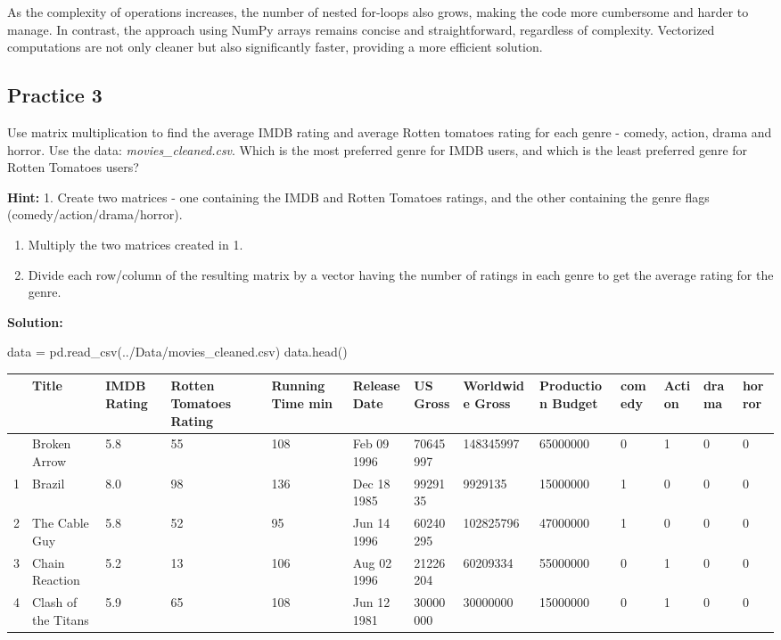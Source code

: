 \documentclass[
  letterpaper,
  DIV=11,
  numbers=noendperiod]{scrreprt}
\newenvironment{Shaded}{\begin{snugshade}}{\end{snugshade}}
\newcommand{\NormalTok}[1]{\textcolor[rgb]{0.00,0.23,0.31}{#1}}
\newcommand{\OperatorTok}[1]{\textcolor[rgb]{0.37,0.37,0.37}{#1}}
\newcommand{\StringTok}[1]{\textcolor[rgb]{0.13,0.47,0.30}{#1}}
\begin{document}
As the complexity of operations increases, the number of nested
for-loops also grows, making the code more cumbersome and harder to
manage. In contrast, the approach using NumPy arrays remains concise and
straightforward, regardless of complexity. Vectorized computations are
not only cleaner but also significantly faster, providing a more
efficient solution.

\hypertarget{practice-3}{%
\subsection{Practice 3}\label{practice-3}}

Use matrix multiplication to find the average IMDB rating and average
Rotten tomatoes rating for each genre - comedy, action, drama and
horror. Use the data: \emph{movies\_cleaned.csv}. Which is the most
preferred genre for IMDB users, and which is the least preferred genre
for Rotten Tomatoes users?

\textbf{Hint:} 1. Create two matrices - one containing the IMDB and
Rotten Tomatoes ratings, and the other containing the genre flags
(comedy/action/drama/horror).

\begin{enumerate}
\def\labelenumi{\arabic{enumi}.}
\setcounter{enumi}{1}
\item
  Multiply the two matrices created in 1.
\item
  Divide each row/column of the resulting matrix by a vector having the
  number of ratings in each genre to get the average rating for the
  genre.
\end{enumerate}

\textbf{Solution:}

\begin{Shaded}
\begin{Highlighting}[]
\NormalTok{data }\OperatorTok{=}\NormalTok{ pd.read\_csv(}\StringTok{\textquotesingle{}../Data/movies\_cleaned.csv\textquotesingle{}}\NormalTok{)}
\NormalTok{data.head()}
\end{Highlighting}
\end{Shaded}

\begin{longtable}[]{@{}lllllllllllll@{}}
\toprule\noalign{}
& Title & IMDB Rating & Rotten Tomatoes Rating & Running Time min &
Release Date & US Gross & Worldwide Gross & Production Budget & comedy &
Action & drama & horror \\
\midrule\noalign{}
\endhead
\bottomrule\noalign{}
\endlastfoot
0 & Broken Arrow & 5.8 & 55 & 108 & Feb 09 1996 & 70645997 & 148345997 &
65000000 & 0 & 1 & 0 & 0 \\
1 & Brazil & 8.0 & 98 & 136 & Dec 18 1985 & 9929135 & 9929135 & 15000000
& 1 & 0 & 0 & 0 \\
2 & The Cable Guy & 5.8 & 52 & 95 & Jun 14 1996 & 60240295 & 102825796 &
47000000 & 1 & 0 & 0 & 0 \\
3 & Chain Reaction & 5.2 & 13 & 106 & Aug 02 1996 & 21226204 & 60209334
& 55000000 & 0 & 1 & 0 & 0 \\
4 & Clash of the Titans & 5.9 & 65 & 108 & Jun 12 1981 & 30000000 &
30000000 & 15000000 & 0 & 1 & 0 & 0 \\
\end{longtable}
\end{document}
